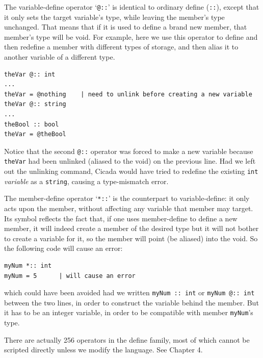 \documentclass{article}
\newenvironment{code}{
       \begin{list}{}{
               \setlength{\leftmargin}{.4in}
               \setlength{\rightmargin}{0in}
               \setlength{\topsep}{.2in}
       }
       \small
       \item[] }
       { \end{list}   }
\begin{document}
The variable-define operator `\texttt{@::}' is identical to ordinary define (\texttt{::}), except that it only sets the target variable's type, while leaving the member's type unchanged.  That means that if it is used to define a brand new member, that member's type will be void.  For example, here we use this operator to define and then redefine a member with different types of storage, and then alias it to another variable of a different type.

\begin{code} \begin{verbatim}
theVar @:: int
...
theVar = @nothing    | need to unlink before creating a new variable
theVar @:: string
...
theBool :: bool
theVar = @theBool
\end{verbatim} \end{code}

\noindent Notice that the second \verb#@::# operator was forced to make a new variable because \verb#theVar# had been unlinked (aliased to the void) on the previous line.  Had we left out the unlinking command, Cicada would have tried to redefine the existing \verb#int# \emph{variable} as a \verb#string#, causing a type-mismatch error.

The member-define operator `\texttt{*::}' is the counterpart to variable-define:  it only acts upon the member, without affecting any variable that member may target.  Its symbol reflects the fact that, if one uses member-define to define a new member, it will indeed create a member of the desired type but it will not bother to create a variable for it, so the member will point (be aliased) into the void.  So the following code will cause an error:

\begin{code} \begin{verbatim}
myNum *:: int
myNum = 5      | will cause an error
\end{verbatim} \end{code}

\noindent which could have been avoided had we written \verb#myNum :: int# or \verb#myNum @:: int# between the two lines, in order to construct the variable behind the member.  But it has to be an integer variable, in order to be compatible with member \verb#myNum#'s type.

There are actually 256 operators in the define family, most of which cannot be scripted directly unless we modify the language.  See Chapter 4.\\
\end{document}
